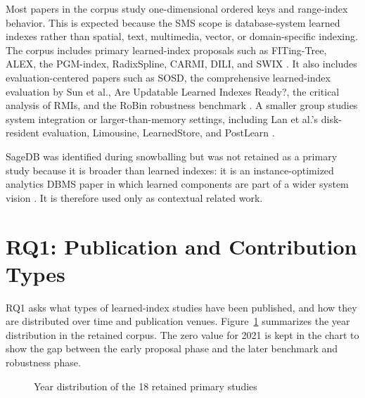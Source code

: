 \documentclass[a4paper, 12pt, twoside]{report}
\begin{document}
Most papers in the corpus study one-dimensional ordered keys and range-index behavior. This is expected because the SMS scope is database-system learned indexes rather than spatial, text, multimedia, vector, or domain-specific indexing. The corpus includes primary learned-index proposals such as FITing-Tree, ALEX, the PGM-index, RadixSpline, CARMI, DILI, and SWIX \cite{galakatos2019fiting,ding2020alex,ferragina2020pgm,kipf2020radixspline,zhang2022carmi,li2023dili,liang2024swix}. It also includes evaluation-centered papers such as SOSD, the comprehensive learned-index evaluation by Sun et al., Are Updatable Learned Indexes Ready?, the critical analysis of RMIs, and the RoBin robustness benchmark \cite{marcus2020benchmarking,sun2023learned,wongkham2022ready,maltry2022critical,luo2025robustness}. A smaller group studies system integration or larger-than-memory settings, including Lan et al.'s disk-resident evaluation, Limousine, LearnedStore, and PostLearn \cite{lan2023disk,chatterjee2024limousine,maharjan2023learnedstore,fuad2026postlearn}.

SageDB was identified during snowballing but was not retained as a primary study because it is broader than learned indexes: it is an instance-optimized analytics DBMS paper in which learned components are part of a wider system vision \cite{ding2022sagedb}. It is therefore used only as contextual related work.

\newpage
\section{RQ1: Publication and Contribution Types}

RQ1 asks what types of learned-index studies have been published, and how they are distributed over time and publication venues. Figure~\ref{fig:year-distribution} summarizes the year distribution in the retained corpus. The zero value for 2021 is kept in the chart to show the gap between the early proposal phase and the later benchmark and robustness phase.

\begin{figure}[h]
\centering
{}
\caption{Year distribution of the 18 retained primary studies}
\label{fig:year-distribution}
\end{figure}
\end{document}
